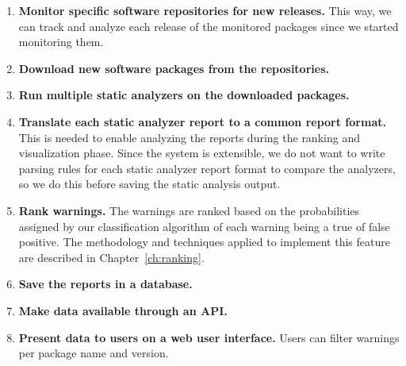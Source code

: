 \begin{enumerate}
\item \textbf{Monitor specific software repositories for new releases.} This way, we can track and analyze each release of the monitored packages since we started monitoring them.

\item \textbf{Download new software packages from the repositories.}

\item \textbf{Run multiple static analyzers on the downloaded packages.}

\item \textbf{Translate each static analyzer report to a common report format.} This is needed to enable analyzing the reports during the ranking and visualization phase. Since the system is extensible, we do not want to write parsing rules for each static analyzer report format to compare the analyzers, so we do this before saving the static analysis output.

\item \textbf{Rank warnings.} The warnings are ranked based on the probabilities assigned by our classification algorithm of each warning being a true of false positive. The methodology and techniques applied to implement this feature are described in Chapter~\ref{ch:ranking}.

\item \textbf{Save the reports in a database.}

\item \textbf{Make data available through an API.}

\item \textbf{Present data to users on a web user interface.} Users can filter warnings per package name and version.
\end{enumerate}

